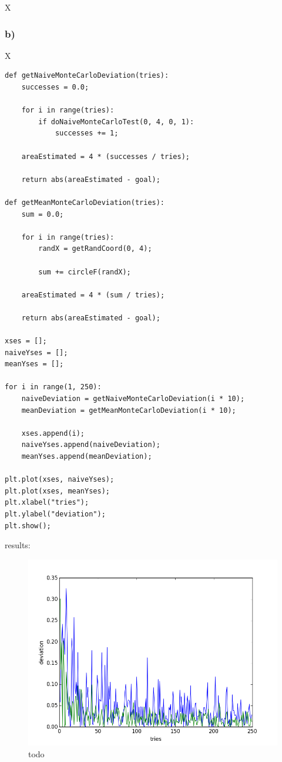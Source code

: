 X



\subsubsection{b)}

X

\begin{lstlisting}[caption=todo]
def getNaiveMonteCarloDeviation(tries):
	successes = 0.0;
	
	for i in range(tries):
		if doNaiveMonteCarloTest(0, 4, 0, 1):
			successes += 1;
	
	areaEstimated = 4 * (successes / tries);
	
	return abs(areaEstimated - goal);

def getMeanMonteCarloDeviation(tries):
	sum = 0.0;
	
	for i in range(tries):
		randX = getRandCoord(0, 4);
		
		sum += circleF(randX);
	
	areaEstimated = 4 * (sum / tries);
	
	return abs(areaEstimated - goal);

xses = [];
naiveYses = [];
meanYses = [];

for i in range(1, 250):
	naiveDeviation = getNaiveMonteCarloDeviation(i * 10);
	meanDeviation = getMeanMonteCarloDeviation(i * 10);
	
	xses.append(i);
	naiveYses.append(naiveDeviation);
	meanYses.append(meanDeviation);

plt.plot(xses, naiveYses);
plt.plot(xses, meanYses);
plt.xlabel("tries");
plt.ylabel("deviation");
plt.show();
\end{lstlisting}


results:


\begin{figure}[!ht]
\includegraphics[width=1\textwidth]{chapters/images/figure-7-12-b}
\caption{todo}
\end{figure}


